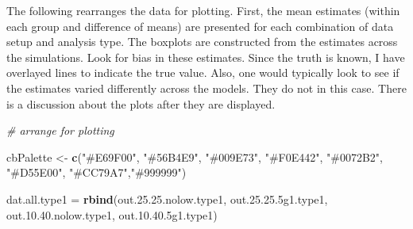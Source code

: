 \documentclass[
]{book}
\newenvironment{Shaded}{\begin{snugshade}}{\end{snugshade}}
\newcommand{\CommentTok}[1]{\textcolor[rgb]{0.56,0.35,0.01}{\textit{#1}}}
\newcommand{\DecValTok}[1]{\textcolor[rgb]{0.00,0.00,0.81}{#1}}
\newcommand{\FloatTok}[1]{\textcolor[rgb]{0.00,0.00,0.81}{#1}}
\newcommand{\KeywordTok}[1]{\textcolor[rgb]{0.13,0.29,0.53}{\textbf{#1}}}
\newcommand{\NormalTok}[1]{#1}
\newcommand{\StringTok}[1]{\textcolor[rgb]{0.31,0.60,0.02}{#1}}
\begin{document}
The following rearranges the data for plotting. First, the mean estimates (within each group and difference of means) are presented for each combination of data setup and analysis type. The boxplots are constructed from the estimates across the simulations. Look for bias in these estimates. Since the truth is known, I have overlayed lines to indicate the true value. Also, one would typically look to see if the estimates varied differently across the models. They do not in this case. There is a discussion about the plots after they are displayed.

\begin{Shaded}
\begin{Highlighting}[]
\CommentTok{\# arrange for plotting}

\NormalTok{cbPalette <{-}}\StringTok{ }\KeywordTok{c}\NormalTok{(}\StringTok{"\#E69F00"}\NormalTok{, }\StringTok{"\#56B4E9"}\NormalTok{, }\StringTok{"\#009E73"}\NormalTok{, }\StringTok{"\#F0E442"}\NormalTok{, }\StringTok{"\#0072B2"}\NormalTok{, }\StringTok{"\#D55E00"}\NormalTok{, }\StringTok{"\#CC79A7"}\NormalTok{,}\StringTok{"\#999999"}\NormalTok{)}

\NormalTok{ dat.all.type1 =}\StringTok{ }\KeywordTok{rbind}\NormalTok{(out.}\DecValTok{25}\NormalTok{.}\FloatTok{25.}\NormalTok{nolow.type1,}
\NormalTok{                       out.}\DecValTok{25}\NormalTok{.}\FloatTok{25.5}\NormalTok{g1.type1,}
\NormalTok{                       out.}\DecValTok{10}\NormalTok{.}\FloatTok{40.}\NormalTok{nolow.type1,}
\NormalTok{                       out.}\DecValTok{10}\NormalTok{.}\FloatTok{40.5}\NormalTok{g1.type1)}
 

\end{Highlighting}
\end{Shaded}
\end{document}
